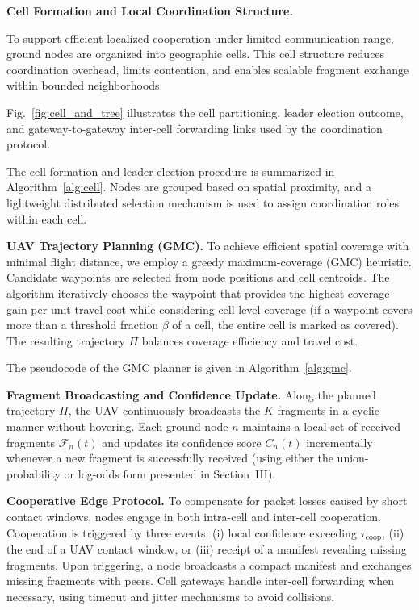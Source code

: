\documentclass[conference]{IEEEtran}
\begin{document}
\noindent\textbf{Cell Formation and Local Coordination Structure.}

To support efficient localized cooperation under limited communication range, ground nodes are organized into geographic cells. This cell structure reduces coordination overhead, limits contention, and enables scalable fragment exchange within bounded neighborhoods.

Fig.~\ref{fig:cell_and_tree} illustrates the cell partitioning, leader election outcome, and gateway-to-gateway inter-cell forwarding links used by the coordination protocol.

The cell formation and leader election procedure is summarized in Algorithm~\ref{alg:cell}. Nodes are grouped based on spatial proximity, and a lightweight distributed selection mechanism is used to assign coordination roles within each cell.

\noindent\textbf{UAV Trajectory Planning (GMC).}
To achieve efficient spatial coverage with minimal flight distance, we employ a greedy maximum-coverage (GMC) heuristic. Candidate waypoints are selected from node positions and cell centroids. The algorithm iteratively chooses the waypoint that provides the highest coverage gain per unit travel cost while considering cell-level coverage (if a waypoint covers more than a threshold fraction \(\beta\) of a cell, the entire cell is marked as covered). The resulting trajectory \(\Pi\) balances coverage efficiency and travel cost.

The pseudocode of the GMC planner is given in Algorithm~\ref{alg:gmc}.

\noindent\textbf{Fragment Broadcasting and Confidence Update.}
Along the planned trajectory \(\Pi\), the UAV continuously broadcasts the \(K\) fragments in a cyclic manner without hovering. Each ground node \(n\) maintains a local set of received fragments \(\mathcal{F}_n(t)\) and updates its confidence score \(C_n(t)\) incrementally whenever a new fragment is successfully received (using either the union-probability or log-odds form presented in Section~III).

\noindent\textbf{Cooperative Edge Protocol.}
To compensate for packet losses caused by short contact windows, nodes engage in both intra-cell and inter-cell cooperation. Cooperation is triggered by three events: (i) local confidence exceeding \(\tau_{\text{coop}}\), (ii) the end of a UAV contact window, or (iii) receipt of a manifest revealing missing fragments. Upon triggering, a node broadcasts a compact manifest and exchanges missing fragments with peers. Cell gateways handle inter-cell forwarding when necessary, using timeout and jitter mechanisms to avoid collisions.
\end{document}
